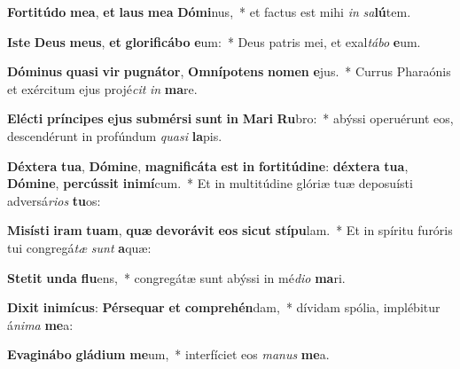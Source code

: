 \item \textbf{For}\textbf{ti}\textbf{tú}\textbf{do} \textbf{me}\textbf{a}, \textbf{et} \textbf{laus} \textbf{me}\textbf{a} \textbf{Dó}\textbf{mi}nus,~* et factus est mihi \textit{in} \textit{sa}\textbf{lú}tem.
\item \textbf{Is}\textbf{te} \textbf{De}\textbf{us} \textbf{me}\textbf{us}, \textbf{et} \textbf{glo}\textbf{ri}\textbf{fi}\textbf{cá}\textbf{bo} \textbf{e}um:~* Deus patris mei, et exal\textit{tá}\textit{bo} \textbf{e}um.
\item \textbf{Dó}\textbf{mi}\textbf{nus} \textbf{qua}\textbf{si} \textbf{vir} \textbf{pu}\textbf{gná}\textbf{tor}, \textbf{Om}\textbf{ní}\textbf{pot}\textbf{ens} \textbf{no}\textbf{men} \textbf{e}jus.~* Currus Pharaónis et exércitum ejus projé\textit{cit} \textit{in} \textbf{ma}re.
\item \textbf{E}\textbf{léc}\textbf{ti} \textbf{prín}\textbf{ci}\textbf{pes} \textbf{e}\textbf{jus} \textbf{sub}\textbf{mér}\textbf{si} \textbf{sunt} \textbf{in} \textbf{Ma}\textbf{ri} \textbf{Ru}bro:~* abýssi operuérunt eos, descendérunt in profúndum \textit{qua}\textit{si} \textbf{la}pis.
\item \textbf{Déx}\textbf{te}\textbf{ra} \textbf{tu}\textbf{a}, \textbf{Dó}\textbf{mi}\textbf{ne}, \textbf{ma}\textbf{gni}\textbf{fi}\textbf{cá}\textbf{ta} \textbf{est} \textbf{in} \textbf{for}\textbf{ti}\textbf{tú}\textbf{di}\textbf{ne}: \textbf{déx}\textbf{te}\textbf{ra} \textbf{tu}\textbf{a}, \textbf{Dó}\textbf{mi}\textbf{ne}, \textbf{per}\textbf{cús}\textbf{sit} \textbf{in}\textbf{i}\textbf{mí}cum.~* Et in multitúdine glóriæ tuæ deposuísti adversá\textit{ri}\textit{os} \textbf{tu}os:
\item \textbf{Mi}\textbf{sís}\textbf{ti} \textbf{i}\textbf{ram} \textbf{tu}\textbf{am}, \textbf{quæ} \textbf{de}\textbf{vo}\textbf{rá}\textbf{vit} \textbf{e}\textbf{os} \textbf{sic}\textbf{ut} \textbf{stí}\textbf{pu}lam.~* Et in spíritu furóris tui congregá\textit{tæ} \textit{sunt} \textbf{a}quæ:
\item \textbf{Ste}\textbf{tit} \textbf{un}\textbf{da} \textbf{flu}ens,~* congregátæ sunt abýssi in mé\textit{di}\textit{o} \textbf{ma}ri.
\item \textbf{Di}\textbf{xit} \textbf{in}\textbf{i}\textbf{mí}\textbf{cus}: \textbf{Pér}\textbf{se}\textbf{quar} \textbf{et} \textbf{com}\textbf{pre}\textbf{hén}dam,~* dívidam spólia, implébitur á\textit{ni}\textit{ma} \textbf{me}a:
\item \textbf{E}\textbf{va}\textbf{gi}\textbf{ná}\textbf{bo} \textbf{glá}\textbf{di}\textbf{um} \textbf{me}um,~* interfíciet eos \textit{ma}\textit{nus} \textbf{me}a.
